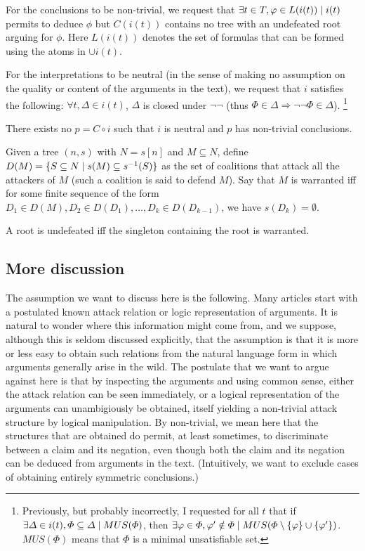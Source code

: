 \documentclass[version=3.21, pagesize, twoside=off, bibliography=totoc, DIV=calc, fontsize=12pt, a4paper, french, english]{scrartcl}
\begin{document}
For the conclusions to be non-trivial, we request that $\exists t \in T, \phi \in L(i(t)) \suchthat i(t) $ permits to deduce $\phi$ but $C(i(t))$ contains no tree with an undefeated root arguing for $\phi$. Here $L(i(t))$ denotes the set of formulas that can be formed using the atoms in $\cup i(t)$.

For the interpretations to be neutral (in the sense of making no assumption on the quality or content of the arguments in the text), we request that $i$ satisfies the following: $\forall t, \Delta \in i(t)$, $\Delta$ is closed under $¬¬$ (thus $\Phi \in \Delta ⇒ ¬¬\Phi \in \Delta$).
\footnote{Previously, but probably incorrectly, I requested for all $t$ that if $\exists \Delta \in i(t), \Phi \subseteq \Delta \suchthat MUS(\Phi)$, then $\exists \phi \in \Phi, \phi' \notin \Phi \suchthat MUS(\Phi \setminus \set{\phi} \cup \set{\phi'})$. $MUS(\Phi)$ means that $\Phi$ is a minimal unsatisfiable set.}

\begin{theorem}
	There exists no $p = C \circ i$ such that $i$ is neutral and $p$ has non-trivial conclusions.
\end{theorem}
Given a tree $(n, s)$ with $N = s[n]$ and $M \subseteq N$, define $D(M) = \set{S \subseteq N \suchthat s(M) \subseteq s^{-1}(S)}$ as the set of coalitions that attack all the attackers of $M$ (such a coalition is said to defend $M$). Say that $M$ is warranted iff for some finite sequence of the form $D_1 \in D(M), D_2 \in D(D_1), …, D_k \in D(D_{k - 1})$, we have $s(D_k) = \emptyset$.
\begin{lemma}
	A root is undefeated iff the singleton containing the root is warranted.
\end{lemma}

\subsection{More discussion}

The assumption we want to discuss here is the following.
Many articles start with a postulated known attack relation or logic representation of arguments. It is natural to wonder where this information might come from, and we suppose, although this is seldom discussed explicitly, that the assumption is that it is more or less easy to obtain such relations from the natural language form in which arguments generally arise in the wild. 
The postulate that we want to argue against here is that by inspecting the arguments and using common sense, either the attack relation can be seen immediately, or a logical representation of the arguments can unambigiously be obtained, itself yielding a non-trivial attack structure by logical manipulation.
By non-trivial, we mean here that the structures that are obtained do permit, at least sometimes, to discriminate between a claim and its negation, even though both the claim and its negation can be deduced from arguments in the text. (Intuitively, we want to exclude cases of obtaining entirely symmetric conclusions.)
\end{document}
